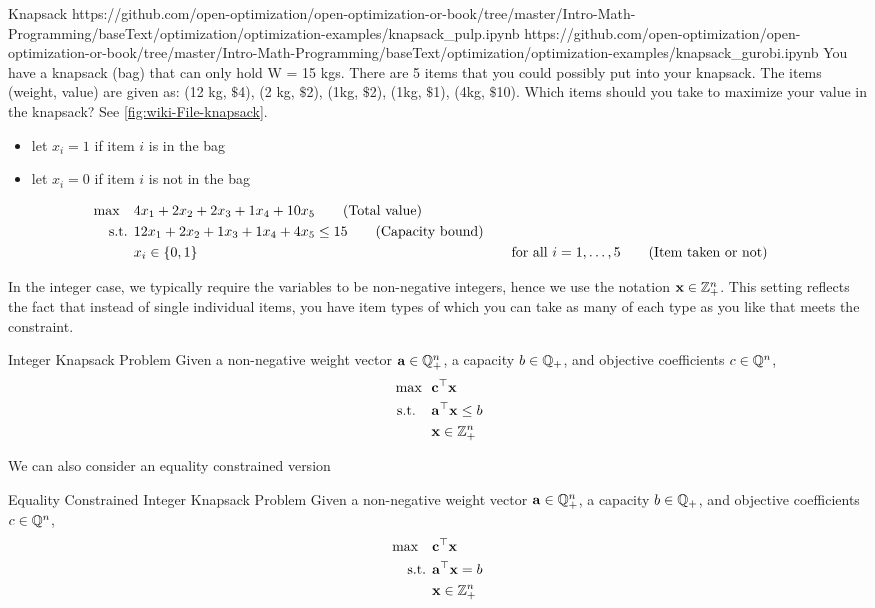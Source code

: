 \begin{examplewithallcode}{Knapsack}
{}
{https://github.com/open-optimization/open-optimization-or-book/tree/master/Intro-Math-Programming/baseText/optimization/optimization-examples/knapsack_pulp.ipynb}
{https://github.com/open-optimization/open-optimization-or-book/tree/master/Intro-Math-Programming/baseText/optimization/optimization-examples/knapsack_gurobi.ipynb}
\label{example:knapsack}
You have a knapsack (bag) that can only hold W = 15 kgs.  There are 5 items that you could possibly put into your knapsack.  The items (weight, value) are given as:
(12 kg, $\$$4), (2 kg, $\$$2), (1kg, $\$$2), (1kg, $\$$1), (4kg, $\$$10).  Which items should you take to maximize your value in the knapsack? See \autoref{fig:wiki-File-knapsack}.\\

\begin{itemize}
\item let $x_i = 1$ if item $i$ is in the bag
\item let $x_i = 0$ if item $i$ is not in the bag
\end{itemize}
\begin{align}
\max \quad & 4 x_1 + 2 x_2 + 2 x_3 + 1 x_4 + 10 x_5   \tag{Total value} \\
\text{ s.t. }        & 12 x_1 + 2 x_2 + 1 x_3 + 1 x_4 + 4 x_5 \leq 15   \tag{Capacity bound} \\
& x_i \in \{0,1\} &&\quad \text{for all } i=1, \dots, 5   \tag{Item taken or not}
\end{align}
\end{examplewithallcode}
In the integer case, we typically require the variables to be non-negative integers, hence we use the notation $\mathbf{x} \in \mathbb{Z}^n_+$.  This setting reflects the fact that instead of single individual items, you have item types of which you can take as many of each type as you like that meets the constraint.
\begin{general}{Integer Knapsack Problem}{\npcomplete}
Given a non-negative weight vector $\mathbf{a} \in \mathbb{Q}^n_+$, a capacity $b \in \mathbb{Q}_+$, and objective coefficients $c \in \mathbb{Q}^n$, 
\begin{equation}
\begin{split}
\max \ \ & \mathbf{c}^\top \mathbf{x}\\
\text{ s.t. } \ \ & \mathbf{a}^\top \mathbf{x} \leq b\\
& \mathbf{x} \in \mathbb{Z}^n_+
\end{split}
\end{equation}
\end{general}
We can also consider an equality constrained version
\begin{general}{Equality Constrained Integer Knapsack Problem}{\nphard}
Given a non-negative weight vector $\mathbf{a} \in \mathbb{Q}^n_+$, a capacity $b \in \mathbb{Q}_+$, and objective coefficients $c \in \mathbb{Q}^n$, 
\begin{align}
\max \quad & \mathbf{c}^\top \mathbf{x} \\
\text{ s.t. }        & \mathbf{a}^\top \mathbf{x} = b \\
& \mathbf{x} \in \mathbb{Z}^n_+
\end{align}
\end{general}



